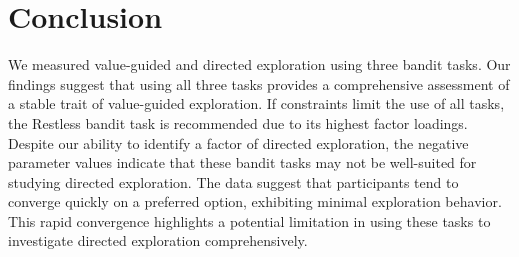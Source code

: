 \documentclass[fleqn,10pt]{wlscirep}
\begin{document}

\section*{Conclusion}

We measured value-guided and directed exploration using three bandit tasks. Our findings suggest that using all three tasks provides a comprehensive assessment of a stable trait of value-guided exploration. If constraints limit the use of all tasks, the Restless bandit task is recommended due to its highest factor loadings. Despite our ability to identify a factor of directed exploration, the negative parameter values indicate that these bandit tasks may not be well-suited for studying directed exploration. The data suggest that participants tend to converge quickly on a preferred option, exhibiting minimal exploration behavior. This rapid convergence highlights a potential limitation in using these tasks to investigate directed exploration comprehensively.

 
\end{document}
